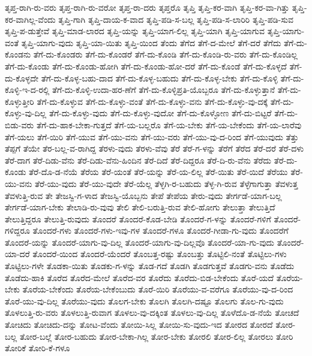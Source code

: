 {ತೃಪ್ತ-ರಾಗಿ-ರು-ವರು
ತೃಪ್ತ-ರಾಗಿ-ರು-ವರೋ
ತೃಪ್ತ-ರಾ-ದರು
ತೃಪ್ತರೊ
ತೃಪ್ತಿ
ತೃಪ್ತಿ-ಕರ-ವಾಗಿ
ತೃಪ್ತಿ-ಕರ-ವಾ-ಗಿತ್ತು
ತೃಪ್ತಿ-ಕರ-ವಾಗಿಲ್ಲ-ವೆಂದು
ತೃಪ್ತಿ-ಗಾಗಿ
ತೃಪ್ತಿ-ದಾಯ-ಕ-ವಾದ
ತೃಪ್ತಿ-ಪಡಿ-ಸ-ಬಲ್ಲ
ತೃಪ್ತಿ-ಪಡಿ-ಸ-ಲಾರಿರಿ
ತೃಪ್ತಿ-ಪಡಿ-ಸುವ
ತೃಪ್ತಿ-ಪ-ಡುತ್ತೇವೆ
ತೃಪ್ತಿ-ಮಾಡ-ಲಾರದ
ತೃಪ್ತಿ-ಯನ್ನು
ತೃಪ್ತಿ-ಯಾಗ-ಲಿಲ್ಲ
ತೃಪ್ತಿ-ಯಾಗಿ
ತೃಪ್ತಿ-ಯಾಗುವ
ತೃಪ್ತಿ-ಯಾಗು-ವಂತೆ
ತೃಪ್ತಿ-ಯಾಗು-ವುದು
ತೃಪ್ತಿ-ಯಾ-ಯಿತು
ತೃಪ್ತಿ-ಯಿಂದ
ತೆಂದು
ತೆಗೆದ
ತೆಗೆ-ದ-ಮೇಲೆ
ತೆಗೆ-ದರೆ
ತೆಗೆದು
ತೆಗೆ-ದು-ಕೊಂಡನು
ತೆಗೆ-ದು-ಕೊಂಡರು
ತೆಗೆ-ದು-ಕೊಂಡರೆ
ತೆಗೆ-ದು-ಕೊಂಡಿ
ತೆಗೆ-ದು-ಕೊಂಡಿ-ರು-ವರು
ತೆಗೆ-ದು-ಕೊಂಡಿಲ್ಲ
ತೆಗೆ-ದು-ಕೊಂಡು
ತೆಗೆ-ದು-ಕೊಂಡು-ಹೋಗಿ
ತೆಗೆ-ದು-ಕೊಂಡು-ಹೋ-ದರೆ
ತೆಗೆ-ದು-ಕೊಂಡೆ
ತೆಗೆ-ದು-ಕೊಳ್ಳದೆ
ತೆಗೆ-ದು-ಕೊಳ್ಳದೇ
ತೆಗೆ-ದು-ಕೊಳ್ಳ-ಬಹು-ದಾದ
ತೆಗೆ-ದು-ಕೊಳ್ಳ-ಬಹುದು
ತೆಗೆ-ದು-ಕೊಳ್ಳ-ಬೇಕು
ತೆಗೆ-ದು-ಕೊಳ್ಳಿ
ತೆಗೆ-ದು-ಕೊಳ್ಳಿ-ಇ-ದ-ರಲ್ಲಿ
ತೆಗೆ-ದು-ಕೊಳ್ಳಿ-ಉದಾ-ಹರ-ಣೆಗೆ
ತೆಗೆ-ದು-ಕೊಳ್ಳಿಪ್ರತಿ-ಯೊಬ್ಬರೂ
ತೆಗೆ-ದು-ಕೊಳ್ಳುತ್ತಾನೆ
ತೆಗೆ-ದು-ಕೊಳ್ಳುತ್ತೀರಿ
ತೆಗೆ-ದು-ಕೊಳ್ಳುವ
ತೆಗೆ-ದು-ಕೊಳ್ಳು-ವಂತೆ
ತೆಗೆ-ದು-ಕೊಳ್ಳು-ವನು
ತೆಗೆ-ದು-ಕೊಳ್ಳು-ವು-ದಕ್ಕೆ
ತೆಗೆ-ದು-ಕೊಳ್ಳು-ವು-ದಿಲ್ಲ
ತೆಗೆ-ದು-ಕೊಳ್ಳು-ವುದು
ತೆಗೆ-ದು-ಕೊಳ್ಳು-ವುದೋ
ತೆಗೆ-ದು-ಕೊಳ್ಳೋಣ
ತೆಗೆ-ದು-ಬಿಟ್ಟರೆ
ತೆಗೆ-ದು-ಬಿಡು-ವರು
ತೆಗೆ-ದು-ಹಾಕ-ಬೇಕಾ-ಗುತ್ತದೆ
ತೆಗೆ-ಯ-ಬಲ್ಲರೊ
ತೆಗೆ-ಯ-ಬೇಕು
ತೆಗೆ-ಯ-ಬೇಕೆಂದು
ತೆಗೆ-ಯ-ಲಾರೆವು
ತೆಗೆ-ಯಲು
ತೆಗೆ-ಯಿರಿ
ತೆಗೆ-ಯುವ
ತೆಗೆ-ಯು-ವನು
ತೆಗೆ-ಯು-ವರು
ತೆಗೆ-ಯು-ವು-ದ-ರಿಂದ
ತೆಗೆ-ಯುವುದು
ತೆತ್ತು
ತೆಪ್ಪಗೆ
ತೆಯೇ
ತೆರ-ಬಲ್ಲ-ವ-ರಾಗಿದ್ದ
ತೆರಳು-ವುದು
ತೆರಳು-ವೆವು
ತೆರೆ
ತೆರೆ-ಗ-ಳನ್ನು
ತೆರೆಗೆ
ತೆರೆದ
ತೆರೆ-ದರೆ
ತೆರೆ-ದಳು
ತೆರೆ-ದಾಗ
ತೆರೆ-ದಿಡು-ವೆನು
ತೆರೆ-ದಿಡು-ವೆನು-ಹಿಂದಿನ
ತೆರೆ-ದಿದೆ
ತೆರೆ-ದಿದ್ದರೂ
ತೆರೆ-ದಿ-ರು-ವೆನು
ತೆರೆದು
ತೆರೆ-ದು-ಕೊಂಡು
ತೆರೆ-ದೊ-ಡ-ನೆಯೆ
ತೆರೆಯ
ತೆರೆ-ಯಂತೆ
ತೆರೆ-ಯನ್ನು
ತೆರೆ-ಯ-ಲಿಲ್ಲ
ತೆರೆ-ಯಿತು
ತೆರೆ-ಯಿದೆ
ತೆರೆಯು
ತೆರೆ-ಯು-ವನು
ತೆರೆ-ಯು-ವುದು
ತೆರೆ-ಯು-ವುದೇ
ತೆರೆ-ಯೆಲ್ಲ
ತೆಳ್ಳಗಿ-ರ-ಬಹುದು
ತೆಳ್ಳ-ಗಿ-ರುವ
ತೆಳ್ಳೆಗಾಗುತ್ತಾ
ತೆವಳುತ್ತ
ತೆವಳುತ್ತಿ-ರುವ
ತೇ
ತೇಜಸ್ವಿ-ಗ-ಳಾದ
ತೇಜಸ್ವಿ-ಯೊಬ್ಬನು
ತೇಪೆ
ತೇಪೆಯ
ತೇರು-ವುದು
ತೇರ್ಗಡೆ-ಯಾಗ-ಬಲ್ಲ
ತೇರ್ಗಡೆ-ಯಾಗ-ಬೇಕು
ತೇಲಾಡಿ-ರು-ವುವು
ತೇಲಿ
ತೇಲಿ-ಬರುತ್ತಿ-ರುವ
ತೇಲಿ-ಹೋಗು
ತೇಲುತ್ತಾ
ತೇಲುತ್ತಿದೆ
ತೇಲುತ್ತಿದ್ದರೂ
ತೇಲುತ್ತಿ-ರುವುದು
ತೊಂದರೆ
ತೊಂದರೆ-ಕೊಡ-ಬೇಡಿ
ತೊಂದರೆ-ಗ-ಳನ್ನು
ತೊಂದರೆ-ಗಳಿಗೆ
ತೊಂದರೆ-ಗಳಿದ್ದರೂ
ತೊಂದರೆ-ಗಳು
ತೊಂದರೆ-ಗಳು-ಇವು-ಗಳ
ತೊಂದರೆ-ಗಳೂ
ತೊಂದರೆ-ಗೀಡಾ-ಗು-ವುದು
ತೊಂದರೆಗೆ
ತೊಂದರೆ-ಯನ್ನು
ತೊಂದರೆ-ಯಾಗು-ವು-ದಿಲ್ಲ
ತೊಂದರೆ-ಯಾಗು-ವು-ದಿಲ್ಲವೊ
ತೊಂದರೆ-ಯಾ-ಗು-ವುದು
ತೊಂದರೆ-ಯಾ-ದರೆ
ತೊಂದರೆ-ಯಿಂದ
ತೊಂದರೆ-ಯೆಂದರೆ
ತೊಂಬತ್ತ-ರಷ್ಟು
ತೊಂಬತ್ತು
ತೊಟ್ಟಿಲಿ-ನಂತೆ
ತೊಟ್ಟಿಲು-ಗಳು
ತೊಟ್ಟಿಲು-ಗಳೇ
ತೊಡಕಾ-ಯಿತು
ತೊಡಕು-ಗ-ಳನ್ನು
ತೊಡ-ಗದೆ
ತೊಡಗಿ
ತೊಡಗುತ್ತವೆ
ತೊಡಗು-ವನು
ತೊಡೆದು
ತೊಡೆದು-ಹಾಕಿ
ತೊರೆದ
ತೊರೆದ-ಮೇಲೆ
ತೊರೆದ-ವರ
ತೊರೆದು
ತೊರೆದು-ಬಿಡ-ಬೇಕೆಂದು
ತೊರೆ-ಯದೆ
ತೊರೆಯ-ಬೇಕು
ತೊರೆಯ-ಬೇಕೆಂದು
ತೊರೆಯ-ಬೇಕೆಂಬುದು
ತೊರೆ-ಯಿರಿ
ತೊರೆಯು-ವ-ವರೆಗೂ
ತೊರೆಯು-ವು-ದ-ರಿಂದ
ತೊರೆ-ಯು-ವು-ದಿಲ್ಲ
ತೊರೆಯು-ವುದು
ತೊಲಗ-ಬೇಕು
ತೊಲಗಿ
ತೊಲಗಿ-ದಷ್ಟೂ
ತೊಲಗು
ತೊಲ-ಗು-ವುದು
ತೊಳಲುತ್ತಿ-ರು-ವರು
ತೊಳಲುತ್ತಿ-ರುವಾಗ
ತೊಳಲು-ವು-ದಕ್ಕಿಂತ
ತೊಳಲು-ವು-ದಿಲ್ಲ
ತೊಳೆದೊ-ಡ-ನೆಯೆ
ತೋಚದೆ
ತೋಚಿದು
ತೋಚಿದು-ದನ್ನು
ತೋಟ-ವೆಂದು
ತೋಯಿ-ಸಿಲ್ಲ
ತೋಯಿ-ಸು-ವುದು-ಇದ
ತೋರದ
ತೋರದೆ
ತೋರ-ಬಲ್ಲ
ತೋರ-ಬಲ್ಲೆ
ತೋರ-ಬಹುದು
ತೋರ-ಬೇಕಾ-ಗಿಲ್ಲ
ತೋರ-ಬೇಕು
ತೋರಲಿ
ತೋರ-ಲಿಲ್ಲ
ತೋರಲು
ತೋರಿ
ತೋರಿಕೆ
ತೋರಿ-ಕೆ-ಗಳೂ
}
